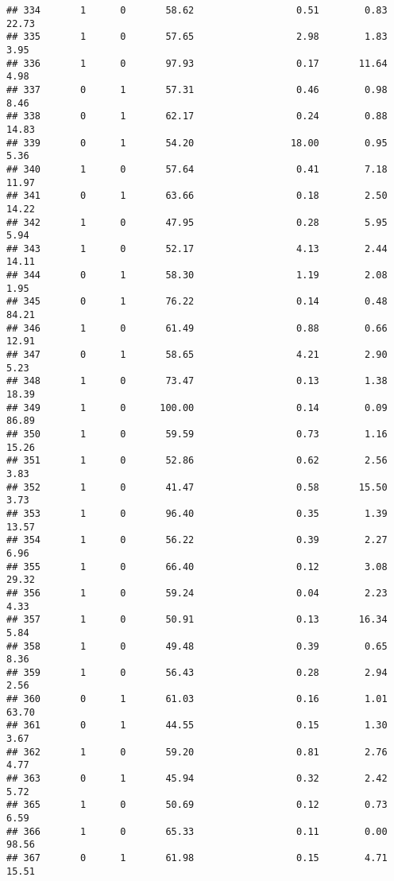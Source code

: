 \documentclass[
]{article}
\begin{document}
\begin{verbatim}
## 334       1      0       58.62                  0.51        0.83       22.73
## 335       1      0       57.65                  2.98        1.83        3.95
## 336       1      0       97.93                  0.17       11.64        4.98
## 337       0      1       57.31                  0.46        0.98        8.46
## 338       0      1       62.17                  0.24        0.88       14.83
## 339       0      1       54.20                 18.00        0.95        5.36
## 340       1      0       57.64                  0.41        7.18       11.97
## 341       0      1       63.66                  0.18        2.50       14.22
## 342       1      0       47.95                  0.28        5.95        5.94
## 343       1      0       52.17                  4.13        2.44       14.11
## 344       0      1       58.30                  1.19        2.08        1.95
## 345       0      1       76.22                  0.14        0.48       84.21
## 346       1      0       61.49                  0.88        0.66       12.91
## 347       0      1       58.65                  4.21        2.90        5.23
## 348       1      0       73.47                  0.13        1.38       18.39
## 349       1      0      100.00                  0.14        0.09       86.89
## 350       1      0       59.59                  0.73        1.16       15.26
## 351       1      0       52.86                  0.62        2.56        3.83
## 352       1      0       41.47                  0.58       15.50        3.73
## 353       1      0       96.40                  0.35        1.39       13.57
## 354       1      0       56.22                  0.39        2.27        6.96
## 355       1      0       66.40                  0.12        3.08       29.32
## 356       1      0       59.24                  0.04        2.23        4.33
## 357       1      0       50.91                  0.13       16.34        5.84
## 358       1      0       49.48                  0.39        0.65        8.36
## 359       1      0       56.43                  0.28        2.94        2.56
## 360       0      1       61.03                  0.16        1.01       63.70
## 361       0      1       44.55                  0.15        1.30        3.67
## 362       1      0       59.20                  0.81        2.76        4.77
## 363       0      1       45.94                  0.32        2.42        5.72
## 365       1      0       50.69                  0.12        0.73        6.59
## 366       1      0       65.33                  0.11        0.00       98.56
## 367       0      1       61.98                  0.15        4.71       15.51

\end{verbatim}
\end{document}
